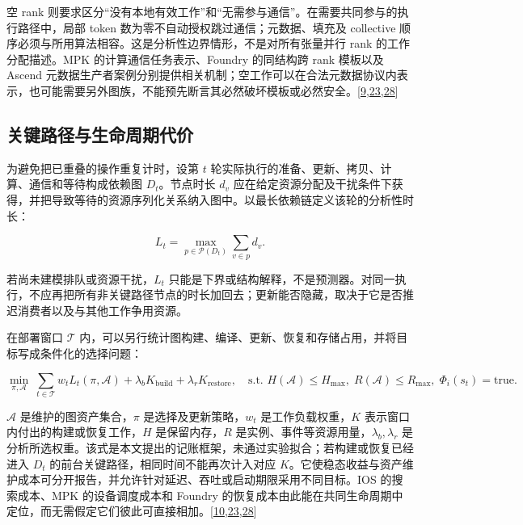 \documentclass[
  UTF8,
  zihao=5]{ctexart}
\begin{document}
空 rank
则要求区分``没有本地有效工作''和``无需参与通信''。在需要共同参与的执行路径中，局部
token 数为零不自动授权跳过通信；元数据、填充及 collective
顺序必须与所用算法相容。这是分析性边界情形，不是对所有张量并行 rank
的工作分配描述。MPK 的计算通信任务表示、Foundry 的同结构跨 rank 模板以及
Ascend
元数据生产者案例分别提供相关机制；空工作可以在合法元数据协议内表示，也可能需要另外图族，不能预先断言其必然破坏模板或必然安全。{[}\protect\hyperlink{ref-vllmascendpr21259}{9},\protect\hyperlink{ref-liu2026foundry}{23},\protect\hyperlink{ref-cheng2026mpk}{28}{]}

\hypertarget{ux5173ux952eux8defux5f84ux4e0eux751fux547dux5468ux671fux4ee3ux4ef7}{%
\subsection*{关键路径与生命周期代价}\label{ux5173ux952eux8defux5f84ux4e0eux751fux547dux5468ux671fux4ee3ux4ef7}}

为避免把已重叠的操作重复计时，设第 \(t\)
轮实际执行的准备、更新、拷贝、计算、通信和等待构成依赖图
\(D_t\)。节点时长 \(d_v\)
应在给定资源分配及干扰条件下获得，并把导致等待的资源序列化关系纳入图中。以最长依赖链定义该轮的分析性时长：

\[ L_t=\max_{p\in\mathcal P(D_t)}\sum_{v\in p}d_v. \]

若尚未建模排队或资源干扰，\(L_t\)
只能是下界或结构解释，不是预测器。对同一执行，不应再把所有非关键路径节点的时长加回去；更新能否隐藏，取决于它是否推迟消费者以及与其他工作争用资源。

在部署窗口 \(\mathcal T\)
内，可以另行统计图构建、编译、更新、恢复和存储占用，并将目标写成条件化的选择问题：

\[ \min_{\pi,\mathcal A}\;\sum_{t\in\mathcal T}w_t L_t(\pi,\mathcal A)
 +\lambda_b K_{\mathrm{build}}+\lambda_r K_{\mathrm{restore}},
 \quad \text{s.t. } H(\mathcal A)\le H_{\max},\;R(\mathcal A)\le R_{\max},\;\Phi_i(s_t)=\mathrm{true}. \]

\(\mathcal A\) 是维护的图资产集合，\(\pi\) 是选择及更新策略，\(w_t\)
是工作负载权重，\(K\) 表示窗口内付出的构建或恢复工作，\(H\)
是保留内存，\(R\) 是实例、事件等资源用量，\(\lambda_b,\lambda_r\)
是分析所选权重。该式是本文提出的记账框架，未通过实验拟合；若构建或恢复已经进入
\(D_t\) 的前台关键路径，相同时间不能再次计入对应
\(K\)。它使稳态收益与资产维护成本可分开报告，并允许针对延迟、吞吐或启动期限采用不同目标。IOS
的搜索成本、MPK 的设备调度成本和 Foundry
的恢复成本由此能在共同生命周期中定位，而无需假定它们彼此可直接相加。{[}\protect\hyperlink{ref-ding2021ios}{10},\protect\hyperlink{ref-liu2026foundry}{23},\protect\hyperlink{ref-cheng2026mpk}{28}{]}
\end{document}
